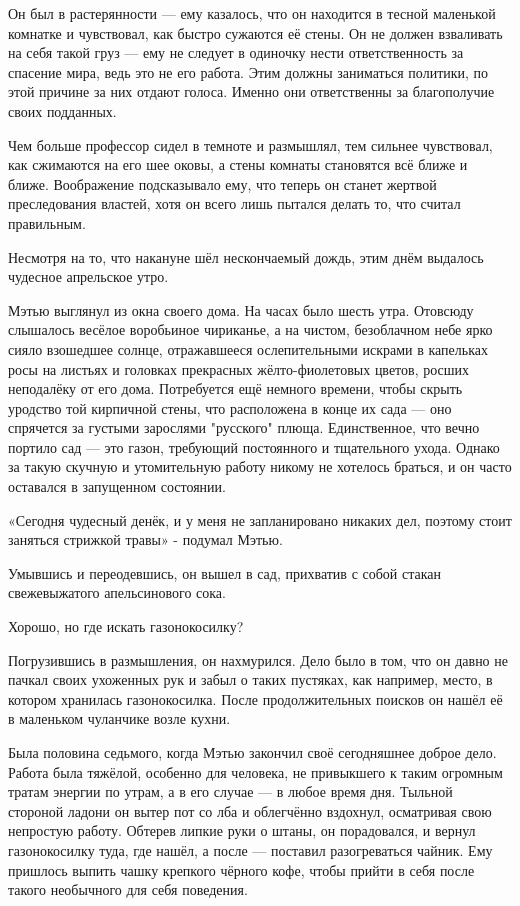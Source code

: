 \documentclass[a5paper, 9pt,
final, openany, twoside=true]{memoir}
\begin{document}
Он был в растерянности — ему казалось, что он находится в тесной маленькой комнатке и чувствовал, как быстро сужаются её стены. Он не должен взваливать на себя такой груз — ему не следует в одиночку нести ответственность за спасение мира, ведь это не его работа. Этим должны заниматься политики, по этой причине за них отдают голоса. Именно они ответственны за благополучие своих подданных.

Чем больше профессор сидел в темноте и размышлял, тем сильнее чувствовал, как сжимаются на его шее оковы, а стены комнаты становятся всё ближе и ближе. Воображение подсказывало ему, что теперь он станет жертвой преследования властей, хотя он всего лишь пытался делать то, что считал правильным.\bigskip

Несмотря на то, что накануне шёл нескончаемый дождь, этим днём выдалось чудесное апрельское утро.

Мэтью выглянул из окна своего дома. На часах было шесть утра. Отовсюду слышалось весёлое воробьиное чириканье, а на чистом, безоблачном небе ярко сияло взошедшее солнце, отражавшееся ослепительными искрами в капельках росы на листьях и головках прекрасных жёлто-фиолетовых цветов, росших неподалёку от его дома. Потребуется ещё немного времени, чтобы скрыть уродство той кирпичной стены, что расположена в конце их сада — оно спрячется за густыми зарослями "русского" плюща. Единственное, что вечно портило сад — это газон, требующий постоянного и тщательного ухода. Однако за такую скучную и утомительную работу никому не хотелось браться, и он часто оставался в запущенном состоянии.

«Сегодня чудесный денёк, и у меня не запланировано никаких дел, поэтому стоит заняться стрижкой травы» - подумал Мэтью.

Умывшись и переодевшись, он вышел в сад, прихватив с собой стакан свежевыжатого апельсинового сока.

Хорошо, но где искать газонокосилку?

Погрузившись в размышления, он нахмурился. Дело было в том, что он давно не пачкал своих ухоженных рук и забыл о таких пустяках, как например, место, в котором хранилась газонокосилка. После продолжительных поисков он нашёл её в маленьком чуланчике возле кухни.\bigskip

Была половина седьмого, когда Мэтью закончил своё сегодняшнее доброе дело. Работа была тяжёлой, особенно для человека, не привыкшего к таким огромным тратам энергии по утрам, а в его случае — в любое время дня. Тыльной стороной ладони он вытер пот со лба и облегчённо вздохнул, осматривая свою непростую работу. Обтерев липкие руки о штаны, он порадовался, и вернул газонокосилку туда, где нашёл, а после — поставил разогреваться чайник. Ему пришлось выпить чашку крепкого чёрного кофе, чтобы прийти в себя после такого необычного для себя поведения.
\end{document}
